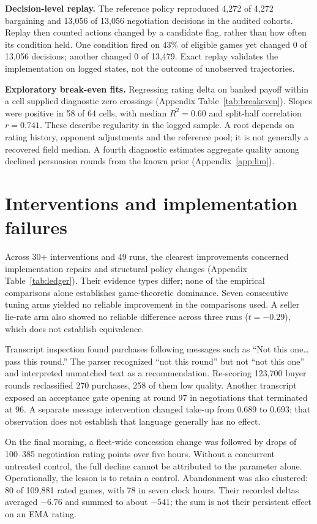 \documentclass{article}
\begin{document}
\textbf{Decision-level replay.} The reference policy reproduced 4,272 of 4,272
bargaining and 13,056 of 13,056 negotiation decisions in the audited cohorts.
Replay then counted actions changed by a candidate flag, rather than how often
its condition held. One condition fired on 43\% of eligible games yet changed
0 of 13,056 decisions; another changed 0 of 13,479. Exact replay validates the
implementation on logged states, not the outcome of unobserved trajectories.

\textbf{Exploratory break-even fits.} Regressing rating delta on banked payoff
within a cell supplied diagnostic zero crossings (Appendix
Table~\ref{tab:breakeven}). Slopes were positive in 58 of 64 cells, with median
$R^2=0.60$ and split-half correlation $r=0.741$. These describe regularity in
the logged sample. A root depends on rating history, opponent adjustments and
the reference pool; it is not generally a recovered field median. A fourth
diagnostic estimates aggregate quality among declined persuasion rounds from
the known prior (Appendix~\ref{app:lim}).

\section{Interventions and implementation failures}
Across 30+ interventions and 49 runs, the clearest improvements concerned
implementation repairs and structural policy changes (Appendix
Table~\ref{tab:ledger}). Their evidence types differ; none of the empirical
comparisons alone establishes game-theoretic dominance. Seven consecutive tuning
arms yielded no reliable improvement in the comparisons used. A seller lie-rate
arm also showed no reliable difference across three runs ($t=-0.29$), which does
not establish equivalence.

Transcript inspection found purchases following messages such as ``Not this
one\ldots pass this round.'' The parser recognized ``not this round'' but not
``not this one'' and interpreted unmatched text as a recommendation. Re-scoring
123,700 buyer rounds reclassified 270 purchases, 258 of them low quality.
Another transcript exposed an acceptance gate opening at round 97 in negotiations
that terminated at 96. A separate message intervention changed take-up from
0.689 to 0.693; that observation does not establish that language generally has
no effect.

On the final morning, a fleet-wide concession change was followed by drops of
100--385 negotiation rating points over five hours. Without a concurrent
untreated control, the full decline cannot be attributed to the parameter alone.
Operationally, the lesson is to retain a control. Abandonment was also clustered:
80 of 109,881 rated games, with 78 in seven clock hours. Their recorded deltas
averaged $-6.76$ and summed to about $-541$; the sum is not their persistent
effect on an EMA rating.
\end{document}
